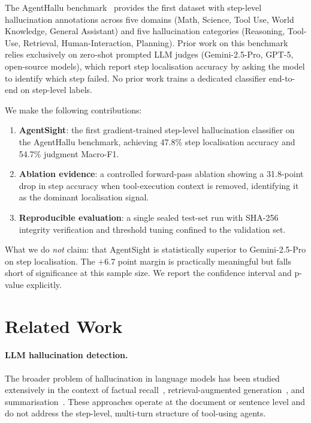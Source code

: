 \documentclass[11pt]{article}
\begin{document}
The AgentHallu benchmark~\citep{agenthallu} provides the first dataset with step-level hallucination annotations across five domains (Math, Science, Tool Use, World Knowledge, General Assistant) and five hallucination categories (Reasoning, Tool-Use, Retrieval, Human-Interaction, Planning). Prior work on this benchmark relies exclusively on zero-shot prompted LLM judges (Gemini-2.5-Pro, GPT-5, open-source models), which report step localisation accuracy by asking the model to identify which step failed. No prior work trains a dedicated classifier end-to-end on step-level labels.

We make the following contributions:
\begin{enumerate}
  \item \textbf{AgentSight}: the first gradient-trained step-level hallucination classifier on the AgentHallu benchmark, achieving 47.8\% step localisation accuracy and 54.7\% judgment Macro-F1.
  \item \textbf{Ablation evidence}: a controlled forward-pass ablation showing a 31.8-point drop in step accuracy when tool-execution context is removed, identifying it as the dominant localisation signal.
  \item \textbf{Reproducible evaluation}: a single sealed test-set run with SHA-256 integrity verification and threshold tuning confined to the validation set.
\end{enumerate}

What we do \emph{not} claim: that AgentSight is statistically superior to Gemini-2.5-Pro on step localisation. The $+$6.7 point margin is practically meaningful but falls short of significance at this sample size. We report the confidence interval and p-value explicitly.

\section{Related Work}

\paragraph{LLM hallucination detection.} The broader problem of hallucination in language models has been studied extensively in the context of factual recall~\citep{truthfulqa}, retrieval-augmented generation~\citep{ragtruth}, and summarisation~\citep{factcc}. These approaches operate at the document or sentence level and do not address the step-level, multi-turn structure of tool-using agents.
\end{document}
